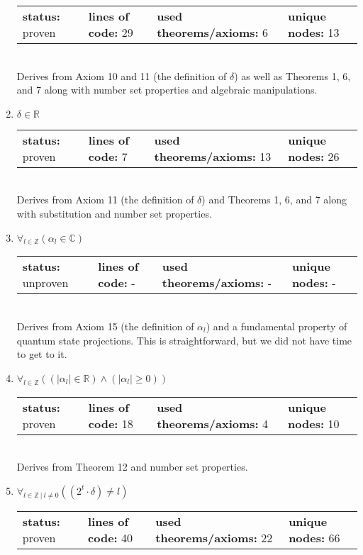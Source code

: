 \documentclass{article}[12pt]
\begin{document}
\begin{enumerate}
  \begin{tabular}{l | l | l | l}
    \textbf{status:} proven & \textbf{lines of code:} 29 & \textbf{used theorems/axioms:} 6 & \textbf{unique nodes:} 13
  \end{tabular} \hfill \\
Derives from Axiom 10 and 11 (the definition of $\delta$) as well as Theorems 1, 6, and 7 along with number set properties and algebraic manipulations.
\item $\delta \in \mathbb{R}$ \hfill \\
  \begin{tabular}{l | l | l | l}
    \textbf{status:} proven & \textbf{lines of code:} 7 & \textbf{used theorems/axioms:} 13 & \textbf{unique nodes:} 26
  \end{tabular} \hfill \\
Derives from Axiom 11 (the definition of $\delta$) and Theorems 1, 6, and 7 along with substitution and number set properties.
\item $\forall_{l \in \mathbb{Z}} \left(\alpha_{l} \in \mathbb{C}\right)$ \hfill \\
  \begin{tabular}{l | l | l | l}
    \textbf{status:} unproven & \textbf{lines of code:} - & \textbf{used theorems/axioms:} - & \textbf{unique nodes:} -
  \end{tabular} \hfill \\
Derives from Axiom 15 (the definition of $\alpha_l$) and a fundamental property of quantum state projections.  This is straightforward, but we did not have time to get to it.
\item $\forall_{l \in \mathbb{Z}} \left(\left(\left|\alpha_{l}\right| \in \mathbb{R}\right) \land \left(\left|\alpha_{l}\right| \geq 0\right)\right)$ \hfill \\
  \begin{tabular}{l | l | l | l}
    \textbf{status:} proven & \textbf{lines of code:} 18 & \textbf{used theorems/axioms:} 4 & \textbf{unique nodes:} 10
  \end{tabular} \hfill \\
Derives from Theorem 12 and number set properties.
\item $\forall_{l \in \mathbb{Z}~|~l \neq 0} \left(\left(2^{t} \cdot \delta\right) \neq l\right)$ \hfill \\
  \begin{tabular}{l | l | l | l}
    \textbf{status:} proven & \textbf{lines of code:} 40 & \textbf{used theorems/axioms:} 22 & \textbf{unique nodes:} 66

\end{tabular}
\end{enumerate}
\end{document}
